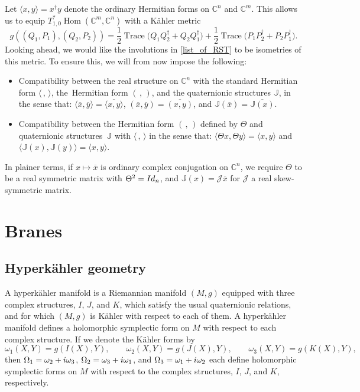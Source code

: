 \documentclass[11pt]{article}
\numberwithin{equation}{section}
\numberwithin{equation}{section}
\DeclareMathOperator{\Hom}{Hom}
\DeclareMathOperator{\Tr}{Trace}
\newcommand{\C}{\mathbb{C}}
\newcommand{\Id}{{\rm Id}}
\begin{document}
\setcounter{subsection}{3}\setcounter{Theorem}{7}\setcounter{equation}{6}
\begin{Remark}%
	Let $\langle x,y\rangle=x^\dagger y$ denote the ordinary Hermitian forms on $\C^n$ and $\C^m$. This allows us to equip $T^*_{1,0}\Hom(\C^m,\C^n)$ with a K\"{a}hler metric
	\begin{equation}\label{metric}
		g((Q_1,P_1),(Q_2,P_2))=\frac{1}{2}\Tr\bigl(Q_1Q_2^\dagger+Q_2Q_1^\dagger\bigr)+\frac{1}{2}\Tr\bigl(P_1P_2^\dagger+P_2P_1^\dagger\bigr).
	\end{equation}
	Looking ahead, we would like the involutions in \eqref{list_of_RST} to be isometries of this metric. To ensure this, we will from now impose the following:
	\begin{itemize}\itemsep=0pt
		\item Compatibility between the real structure on $\C^n$ with the standard Hermitian form $\langle \,,\,\rangle$, the~Hermitian form $(\,,\,)$, and the quaternionic structures $\mathbb{J}$, in the sense that: $\langle\overline{x},\overline{y}\rangle=\overline{\langle x, y\rangle}$, $(\overline{x},\overline{y})=\overline{(x,y)}$, and $\mathbb{J}(\overline{x})=\overline{\mathbb{J}(x)}$.
		\item Compatibility between the Hermitian form $(\,,\,)$ defined by $\Theta$ and quaternionic structures~$\mathbb{J}$ with $\langle\,,\,\rangle$ in the sense that: $\langle \Theta x,\Theta y\rangle=\langle x,y\rangle$ and $\langle\mathbb{J}(x),\mathbb{J}(y)\rangle=\langle x,y\rangle$.
	\end{itemize}
	In plainer terms, if $x\mapsto\overline{x}$ is ordinary complex conjugation on $\C^n$, we require $\Theta$ to be a real symmetric matrix with $\Theta^2=\Id_n$, and $\mathbb{J}(x)=\mathcal{J}\overline{x}$ for $\mathcal{J}$ a real skew-symmetric matrix.
\end{Remark}

\setcounter{section}{3}
\section{Branes}
\subsection{Hyperk\"{a}hler geometry}
A hyperk\"{a}hler manifold is a Riemannian manifold $(M,g)$ equipped with three complex structures, $I$, $J$, and $K$, which satisfy the usual quaternionic relations, and for which $(M,g)$ is K\"{a}hler with respect to each of them. A hyperk\"{a}hler manifold defines a holomorphic symplectic form on $M$ with respect to each complex structure. If we denote the K\"{a}hler forms by
\[
\omega_1(X,Y)=g(I(X),Y),\qquad\omega_2(X,Y)=g(J(X),Y),\qquad\omega_3(X,Y)=g(K(X),Y),
\]
then $\Omega_1=\omega_2+{\rm i}\omega_3$, $\Omega_2=\omega_3+{\rm i}\omega_1$, and $\Omega_3=\omega_1+{\rm i}\omega_2$ each define holomorphic symplectic forms on $M$ with respect to the complex structures, $I$, $J$, and $K$, respectively.
\end{document}
